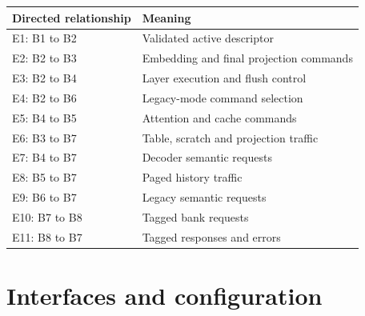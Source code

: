 \documentclass[11pt,a4paper]{article}
\begin{document}
{\small\renewcommand{\arraystretch}{1.18}\begin{longtable}{@{}L{0.24\textwidth}|L{0.7\textwidth}@{}}\toprule

\textbf{Directed relationship} & \textbf{Meaning}\\\midrule\endhead

E1: B1 to B2 & Validated active descriptor\\[2pt]\hline

E2: B2 to B3 & Embedding and final projection commands\\[2pt]\hline

E3: B2 to B4 & Layer execution and flush control\\[2pt]\hline

E4: B2 to B6 & Legacy-mode command selection\\[2pt]\hline

E5: B4 to B5 & Attention and cache commands\\[2pt]\hline

E6: B3 to B7 & Table,\allowbreak{} scratch and projection traffic\\[2pt]\hline

E7: B4 to B7 & Decoder semantic requests\\[2pt]\hline

E8: B5 to B7 & Paged history traffic\\[2pt]\hline

E9: B6 to B7 & Legacy semantic requests\\[2pt]\hline

E10: B7 to B8 & Tagged bank requests\\[2pt]\hline

E11: B8 to B7 & Tagged responses and errors\\[2pt]\hline

\bottomrule\end{longtable}}

\section{Interfaces and configuration}
\end{document}
